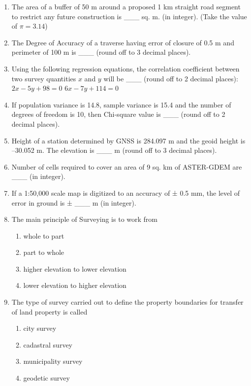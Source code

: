 \documentclass[12pt,a4paper]{article}
\begin{document}
\begin{enumerate}
\item The area of a buffer of 50 m around a proposed 1 km straight road segment to restrict any future construction is \_\_\_ sq. m. (in integer). (Take the value of $\pi = 3.14$)

\item The Degree of Accuracy of a traverse having error of closure of 0.5 m and perimeter of 100 m is \_\_\_ (round off to 3 decimal places).

\item Using the following regression equations, the correlation coefficient between two survey quantities $x$ and $y$ will be \_\_\_ (round off to 2 decimal places):  
$2x - 5y + 98 = 0$  
$6x - 7y + 114 = 0$

\item If population variance is 14.8, sample variance is 15.4 and the number of degrees of freedom is 10, then Chi-square value is \_\_\_ (round off to 2 decimal places).

\item Height of a station determined by GNSS is 284.097 m and the geoid height is –30.052 m. The elevation is \_\_\_ m (round off to 3 decimal places).

\item Number of cells required to cover an area of 9 sq. km of ASTER-GDEM are \_\_\_ (in integer).

\item If a 1:50,000 scale map is digitized to an accuracy of ± 0.5 mm, the level of error in ground is ± \_\_\_ m (in integer).

\item The main principle of Surveying is to work from
\begin{enumerate}
    \item whole to part
    \item part to whole
    \item higher elevation to lower elevation
    \item lower elevation to higher elevation
\end{enumerate}

\item The type of survey carried out to define the property boundaries for transfer of land property is called
\begin{enumerate}
    \item city survey
    \item cadastral survey
    \item municipality survey
    \item geodetic survey
\end{enumerate}


\end{enumerate}
\end{document}
